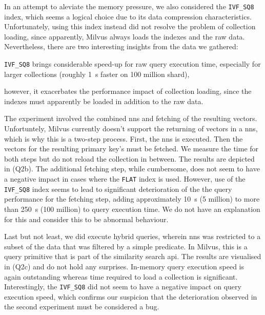 In an attempt to aleviate the memory pressure, we also considered the \texttt{IVF\_SQ8} index, which seems a logical choice due to its data compression characteristics. Unfortunately, using this index instead did not resolve the problem of collection loading, since apparently, Milvus always loads the indexes and the raw data. Nevertheless, there are two interesting insights from the data we gathered:
\begin{enumerate*}[label=(\roman*)]
    \item \texttt{IVF\_SQ8} brings considerable speed-up for raw query execution time, especially for larger collections (roughly \SI{1}{\second} faster on 100 million shard),
    \item however, it exacerbates the performance impact of collection loading, since the indexes must apparently be loaded in addition to the raw data.
\end{enumerate*}

The experiment involved the combined \acrshort{nns} and fetching of the resulting vectors. Unfortuntely, Milvus currently doesn't support the returning of vectors in a \acrshort{nns}, which is why this is a two-step process. First, the \acrshort{nns} is executed. Then the vectors for the resulting primary key's must be fetched. We measure the time for both steps but do not reload the collection in between. The results are depicted in  (Q2b). The additional fetching step, while cumbersome, does not seem to have a negative impact in cases where the \texttt{FLAT} index is used. However, use of the \texttt{IVF\_SQ8} index seems to lead to significant deterioration of the the query performance for the fetching step, adding approximately \SI{10}{\second} (5 million) to more than \SI{250}{\second} (100 million) to query execution time. We do not have an explanation for this and consider this to be abnormal behaviour.

Last but not least, we did execute hybrid queries, wherein \acrshort{nns} was restricted to a subset of the data that was filtered by a simple predicate. In Milvus, this is a query primitive that is part of the similarity search \acrshort{api}. The results are visualised in  (Q2c) and do not hold any surprises. In-memory query execution speed is again outstanding whereas time required to load a collection is significant. Interestingly, the \texttt{IVF\_SQ8} did not seem to have a negative impact on query execution speed, which confirms our suspicion that the deterioration observed in the second experiment must be considered a bug.


